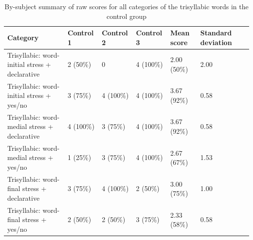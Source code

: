 \documentclass[a4paper]{article}
\begin{document}
\begin{table}[H]
  \begin{center}
    \caption{By-subject summary of raw scores for all categories of the trisyllabic words in the control group}
    \label{tab:table13}
      \begin{tabular}{|p{2cm}|p{2cm}|p{2cm}|p{2cm}|p{2cm}|p{2cm}|p{2cm}}
            \hline
         Category  & Control 1 & Control 2 & Control 3 & Mean score & Standard deviation  \\
         \hline
     Trisyllabic: word-initial stress + declarative & 2 (50\%)  & 0 &   4 (100\%) & 2.00 (50\%) & 2.00 \\
      \hline
     Trisyllabic: word-initial stress + yes/no & 3 (75\%) &  4 (100\%) & 4 (100\%) & 3.67 (92\%) & 0.58 \\
           \hline
     Trisyllabic: word-medial stress + declarative & 4 (100\%) & 3 (75\%) &4 (100\%) & 3.67 (92\%) & 0.58 \\
      \hline
     Trisyllabic: word-medial stress + yes/no & 1 (25\%) &  3 (75\%) &4 (100\%) & 2.67 (67\%) & 1.53\\
           \hline
     Trisyllabic: word-final stress + declarative & 3 (75\%) &4 (100\%) & 2 (50\%) & 3.00 (75\%) & 1.00 \\
      \hline
     Trisyllabic: word-final stress + yes/no & 2 (50\%)  & 2 (50\%) &  3 (75\%) & 2.33 (58\%) & 0.58   \\
     
     \hline
    \end{tabular}
  \end{center}
\end{table}
\end{document}
